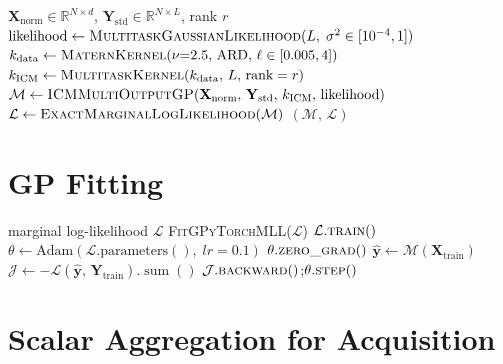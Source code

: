 \documentclass[11pt]{article}
\begin{document}
\begin{algorithm}[H]
\caption{\textsc{InitializeICMGP}}
\begin{algorithmic}[1]
\Require $\mathbf{X}_{\mathrm{norm}} \in \mathbb{R}^{N\times d}$,\;
         $\mathbf{Y}_{\mathrm{std}} \in \mathbb{R}^{N\times L}$,\; rank $r$
\State $\text{likelihood} \gets \textsc{MultitaskGaussianLikelihood}(L,\; \sigma^2 \in [10^{-4},1])$
\State $k_{\mathrm{data}} \gets \textsc{MaternKernel}(\nu{=}2.5,\,\text{ARD},\, \ell \in [0.005,4])$
\State $k_{\mathrm{ICM}} \gets \textsc{MultitaskKernel}(k_{\mathrm{data}},\, L,\, \text{rank}=r)$
\State $\mathcal{M} \gets \textsc{ICMMultiOutputGP}(\mathbf{X}_{\mathrm{norm}},\,\mathbf{Y}_{\mathrm{std}},\,
       k_{\mathrm{ICM}},\, \text{likelihood})$
\State $\mathcal{L} \gets \textsc{ExactMarginalLogLikelihood}(\mathcal{M})$
\State \Return $(\mathcal{M},\, \mathcal{L})$
\end{algorithmic}
\end{algorithm}

\section{GP Fitting}

\begin{algorithm}[H]
\caption{\textsc{Fit} — L-BFGS-B with Adam fallback}
\label{alg:fit}
\begin{algorithmic}[1]
\Require marginal log-likelihood $\mathcal{L}$
\Try
    \State \textsc{FitGPyTorchMLL}($\mathcal{L}$) 
    \State $\mathcal{L}.\textsc{train}()$
    \State $\theta \gets \text{Adam}(\mathcal{L}.\text{parameters}(),\; lr=0.1)$
        \State $\theta.\textsc{zero\_grad}()$
        \State $\hat{\mathbf{y}} \gets \mathcal{M}(\mathbf{X}_{\mathrm{train}})$
        \State $\mathcal{J} \gets -\mathcal{L}(\hat{\mathbf{y}},\,\mathbf{Y}_{\mathrm{train}}).\operatorname{sum}()$
        \State $\mathcal{J}.\textsc{backward}()$;\quad $\theta.\textsc{step}()$
    \EndFor
\EndTry
\end{algorithmic}
\end{algorithm}

\section{Scalar Aggregation for Acquisition}
\end{document}

